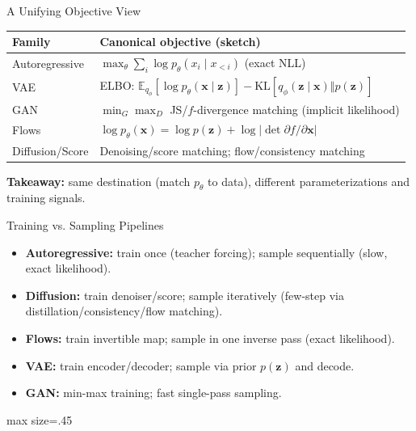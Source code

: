 \documentclass[aspectratio=169]{beamer}
\begin{document}
\begin{frame}{A Unifying Objective View}
\begin{table}
\centering
\begin{tabular}{@{}l l@{}}
\toprule
Family & Canonical objective (sketch) \\
\midrule
Autoregressive & $\max_\theta \sum_i \log p_\theta(x_i \mid x_{<i})$ (exact NLL) \\
VAE & ELBO: $\mathbb{E}_{q_\phi}[\log p_\theta(\mathbf{x}\mid\mathbf{z})]-\mathrm{KL}[q_\phi(\mathbf{z}\mid\mathbf{x})\Vert p(\mathbf{z})]$ \\
GAN & $\min_G \max_D$ JS/$f$-divergence matching (implicit likelihood) \\
Flows & $\log p_\theta(\mathbf{x})=\log p(\mathbf{z})+\log \lvert \det \partial f/\partial \mathbf{x} \rvert$ \\
Diffusion/Score & Denoising/score matching; flow/consistency matching \\
\bottomrule
\end{tabular}
\end{table}
\vspace{2em}
\textbf{Takeaway:} same destination (match $p_\theta$ to data), different parameterizations and training signals.
\end{frame}

\begin{frame}{Training vs. Sampling Pipelines}
\small
\begin{itemize}
  \item \textbf{Autoregressive:} train once (teacher forcing); sample sequentially (slow, exact likelihood).
  \item \textbf{Diffusion:} train denoiser/score; sample iteratively (few-step via distillation/consistency/flow matching).
  \item \textbf{Flows:} train invertible map; sample in one inverse pass (exact likelihood).
  \item \textbf{VAE:} train encoder/decoder; sample via prior $p(\mathbf{z})$ and decode.
  \item \textbf{GAN:} min-max training; fast single-pass sampling.
\end{itemize}
\centering
\begin{adjustbox}{max size={\linewidth}{.45\textheight}}
\end{adjustbox}
\end{frame}
\end{document}
